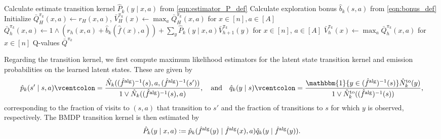 \documentclass[11pt]{article}
\newcommand{\eqdef}{\vcentcolon=}
\newcommand{\alg}{\textnormal{alg}}
\theoremstyle{definition}
\theoremstyle{definition}
\begin{document}
\begin{algorithm}
	\begin{algorithmic}[1]


		\State Calculate estimate transition kernel $\hat{P}_k(y\mid x,a)$ from \eqref{eqn:estimator_P_def}
		\State Calculate exploration bonus $\hat{b}_k(s,a)$ from \eqref{eqn:bonus_def}
		\State Initialize $\bar{Q}^{\pi_k}_{H}(x,a)\gets r_H(x,a)$, $\bar{V}^{\pi_k}_{H}(x)\gets \max_{a}\bar{Q}^{\pi_k}_{H}(x,a)$ for $x\in[n],a\in[A]$
		\State $\bar{Q}^{\pi_k}_{h}(x,a)\gets 1\wedge (r_h(x,a)+\hat{b}_{k}(\hat{f}(x),a)) + \sum_{y}\hat{P}_k(y\mid x,a)\bar{V}_{h+1}^{\pi_k}(y)$ for $x\in[n]$, $a\in[A]$
		\State $\bar{V}^{\pi_k}_{h}(x)\gets \max_{a}\bar{Q}^{\pi_k}_{h}(x,a)$ for $x\in[n]$
		\EndFor
		\State \Return Q-values $\bar{Q}^{\pi_k}$
		\EndProcedure
	\end{algorithmic}
	\caption{Pseudocode for computing the optimistic Q-function.}
	\label{alg:BUCBVI}
\end{algorithm}

Regarding the transition kernel, we first compute maximum likelihood estimators for the latent state transition kernel and emission probabilities on the learned latent states.
These are given by
\begin{equation}
	\label{eqn:estimators_p_q_def}
	\hat{p}_k(s'\mid s,a)
	\eqdef
	\frac{\hat{N}_k((\hat{f}^{\alg})^{-1}(s),a,(\hat{f}^{\alg})^{-1}(s'))}{1\vee \hat{N}_k((\hat{f}^{\alg})^{-1}(s),a)}
	,
	\quad
	\mathrm{and}
	\quad
	\hat{q}_k(y\mid s)
	\eqdef
	\frac{\mathbbm{1}\{y\in (\hat{f}^{\alg})^{-1}(s)\}\hat{N}^{\mathrm{to}}_k(y)}{1\vee \hat{N}^{\mathrm{to}}_k((\hat{f}^{\alg})^{-1}(s))}
	,
\end{equation}
corresponding to the fraction of visits to $(s,a)$ that transition to $s'$ and the fraction of transitions to $s$ for which $y$ is observed, respectively.
The \gls{BMDP} transition kernel is then estimated by
\begin{equation}
	\label{eqn:estimator_P_def}
	\hat{P}_k(y\mid x,a)
	\eqdef
	\hat{p}_k(\hat{f}^{\alg}(y)\mid \hat{f}^{\alg}(x),a)\hat{q}_k(y\mid \hat{f}^{\alg}(y)).
\end{equation}
\end{document}
